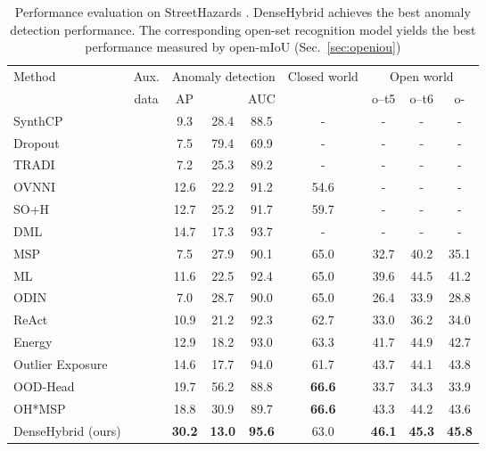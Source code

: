 \documentclass[runningheads]{llncs}
\newcommand{\cmark}{\ding{51}}
\newcommand{\xmark}{\ding{55}}
\begin{document}
\begin{table}[h]
\begin{center}
\caption{Performance evaluation on StreetHazards \cite{hendrycks19arxiv}.
DenseHybrid achieves the best anomaly detection performance.
The corresponding open-set recognition model yields the best performance measured by open-mIoU (Sec.\ \ref{sec:openiou})}
\label{table:osr_sh}
\begin{tabular}{lcccccccc}
\hline \hline
\multirow{2}{*}{Method} & \multicolumn{1}{c|}{Aux.} & \multicolumn{3}{c|}{Anomaly detection} & \multicolumn{1}{c|}{Closed world} & \multicolumn{3}{c}{Open world}\\
  & \multicolumn{1}{c|}{data}  &  AP         &        & \multicolumn{1}{c|}{AUC}     & \multicolumn{1}{c|}{} &  o--t5 & o--t6 & o-\\ \hline \hline
SynthCP \cite{xia20eccv} & \xmark &  9.3           & 28.4          & 88.5     & - &  -  & - & -\\
Dropout \cite{kendall17nips}\cite{xia20eccv} &  \xmark &  7.5           & 79.4          & 69.9   & - &  - & - & -\\
TRADI \cite{franchi20eccv} & \xmark &  7.2           & 25.3          & 89.2        & - & -  & - & -\\
OVNNI \cite{franchi20arxiv} & \xmark & 12.6  & 22.2 & 91.2  & 54.6 & - & - & -\\
SO+H \cite{grcic21visapp}& \xmark & 12.7  & 25.2 & 91.7 & 59.7 & - & - & -\\
DML \cite{cen21iccv} & \xmark  & 14.7  & 17.3  &  93.7 &  - & - & - & -\\
MSP \cite{hendrycks17iclr} & \xmark  &  7.5   &   27.9  & 90.1 &  65.0   &  32.7 & 40.2 & 35.1\\
ML \cite{hendrycks19arxiv} & \xmark  & 11.6   &  22.5    & 92.4  & 65.0   &  39.6 & 44.5 & 41.2\\
ODIN \cite{liang18iclr}&   \xmark   &    7.0       & 28.7    &   90.0  & 65.0 & 26.4 & 33.9 & 28.8\\
ReAct \cite{sun21neurips} & \xmark & 10.9  & 21.2 & 92.3 &  62.7 & 33.0 & 36.2  & 34.0\\
Energy \cite{liu20neurips}& \cmark &  12.9  & 18.2  & 93.0 & 63.3 & 41.7 & 44.9 & 42.7\\
Outlier Exposure \cite{hendrycks19iclr} & \cmark  &  14.6   &  17.7  & 94.0  & 61.7   &  43.7 & 44.1 & 43.8\\
OOD-Head \cite{bevandic19gcpr}  & \cmark   &  19.7 &  56.2   & 88.8 &  \textbf{66.6} & 33.7 & 34.3 & 33.9\\
OH*MSP \cite{bevandic21arxiv} & \cmark  & 18.8  & 30.9 & 89.7 &   \textbf{66.6}  & 43.3 & 44.2 & 43.6\\\hline
DenseHybrid (ours) & \cmark &  \textbf{30.2}  & \textbf{13.0} & \textbf{95.6}  & 63.0 & \textbf{46.1} & \textbf{45.3} & \textbf{45.8} \\\hline
\end{tabular}
\end{center}
\end{table}
\end{document}
